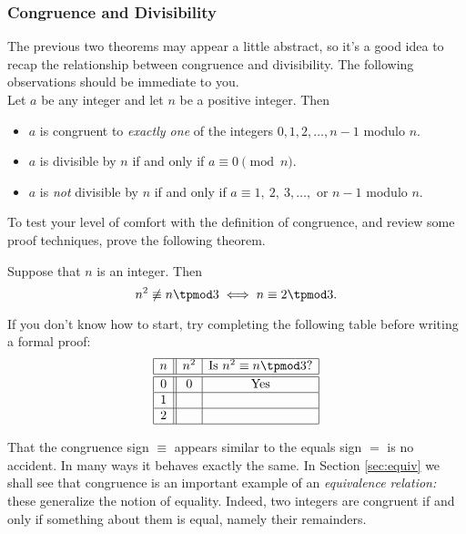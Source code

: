\subsubsection*{Congruence and Divisibility}

The previous two theorems may appear a little abstract, so it's a good idea to recap the relationship between congruence and divisibility. The following observations should be immediate to you.\\

\noindent Let $a$ be any integer and let $n$ be a positive integer. Then\\[-15pt]
\begin{itemize}\setlength{\itemsep}{0pt}
  \item $a$ is congruent to \emph{exactly one} of the integers $0,1,2,\ldots,n-1$ modulo $n$.
	\item $a$ is divisible by $n$ if and only if $a\equiv 0\pmod n$. 
	\item $a$ is \emph{not} divisible by $n$ if and only if $a\equiv 1,\ 2,\ 3,\ldots,$ or $n-1$ modulo $n$. 
\end{itemize}

\noindent To test your level of comfort with the definition of congruence, and review some proof techniques, prove the following theorem. 

\begin{thm}\label{thm:congex}
Suppose that $n$ is an integer. Then
\[n^2\not\equiv n\tpmod 3\iff n\equiv 2\tpmod 3.\]
\end{thm}

\noindent If you don't know how to start, try completing the following table before writing a formal proof:
\[\begin{array}{|c||c|c|}\hline
n&n^2&\text{Is }n^2\equiv n\tpmod 3\text{?}\\\hline\hline
0&0&\text{Yes}\\\hline
1&&\\\hline
2&&\\\hline
\end{array}\]\vspace*{3pt}

That the congruence sign $\equiv$ appears similar to the equals sign $=$ is no accident. In many ways it behaves exactly the same. In Section \ref{sec:equiv} we shall see that congruence is an important example of an \emph{equivalence relation:} these generalize the notion of equality. Indeed, two integers are congruent if and only if something about them is equal, namely their remainders.

